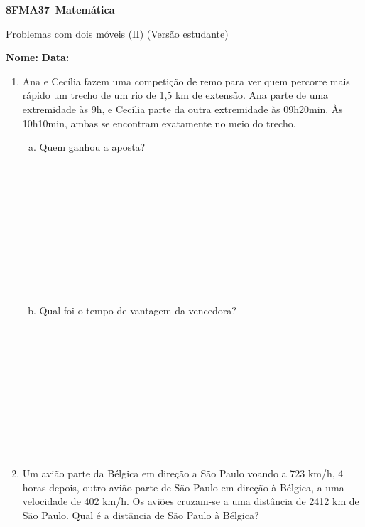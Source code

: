 \documentclass[a4paper,14pt]{article}
\begin{document}
	
	\noindent\textbf{8FMA37~Matemática} 
	
	\begin{center}Problemas com dois móveis (II) (Versão estudante)
	\end{center}
	
	\noindent\textbf{Nome:} \underline{\hspace{10cm}}
	\noindent\textbf{Data:} \underline{\hspace{4cm}}
	
	
    \begin{multicols}{2}
    	\begin{enumerate}
    		\item Ana e Cecília fazem uma competição de remo para ver quem percorre mais rápido um trecho de um rio de 1,5 km de extensão. Ana parte de uma extremidade às 9h, e Cecília parte da outra extremidade às 09h20min. Às 10h10min, ambas se encontram exatamente no meio do trecho.
    		\begin{enumerate}[a)]
    			\item Quem ganhou a aposta? \\\\\\\\\\\\\\\\\\\\\\
    			\item Qual foi o tempo de vantagem da vencedora? \\\\\\\\\\\\\\\\\\\\\\
    		\end{enumerate}
    	    \item Um avião parte da Bélgica em direção a São Paulo voando a 723 km/h, 4 horas depois, outro avião parte de São Paulo em direção à Bélgica, a uma velocidade de 402 km/h. Os aviões cruzam-se a uma distância de 2412 km de São Paulo. Qual é a distância de São Paulo à Bélgica? \\\\\\\\\\\\\\

\end{enumerate}
\end{multicols}
\end{document}
